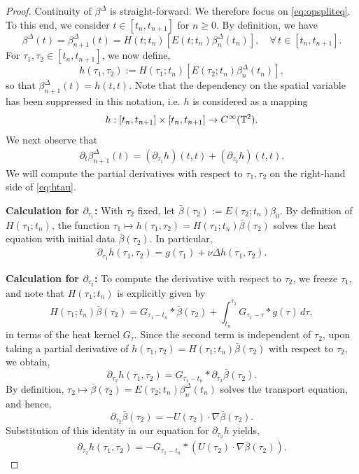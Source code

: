 \documentclass[reqno,12pt]{amsart}
\begin{document}
\begin{proof}
Continuity of ${\beta}^\Delta$ is straight-forward. We therefore focus on \eqref{eq:opspliteq}. To this end, we consider $t \in [t_n,t_{n+1}]$ for $n\ge 0$. By definition, we have
\[
\beta^\Delta(t) =
{\beta}^\Delta_{n+1}(t)
=
 H(t;t_n) \left[ E(t;t_n) {\beta}_n^\Delta(t_n) \right],
 \quad \forall \, t\in [t_n,t_{n+1}].
\]
For $\tau_1,\tau_2 \in [t_n,t_{n+1}]$, we now define,
\[
h(\tau_1,\tau_2) := H(\tau_1;t_n)\left[ E(\tau_2;t_n) {\beta}_n^\Delta(t_n) \right],
\]
so that ${\beta}^\Delta_{n+1}(t) = h(t,t)$. Note that the dependency on the spatial variable has been suppressed in this notation, i.e. $h$ is considered as a mapping
\[
h: [t_n,t_{n+1}] \times [t_n, t_{n+1}]
\to C^\infty(\mathbb{T}^2).
\]
We next observe that
\begin{align}
\label{eq:htau}
\partial_t \beta^\Delta_{n+1}(t)
=
(\partial_{\tau_1} h)(t,t) + (\partial_{\tau_2} h)(t,t).
\end{align}
We will compute the partial derivatives with respect to $\tau_1, \tau_2$ on the right-hand side of \eqref{eq:htau}.

\textbf{Calculation for $\partial_{\tau_1}$:} With $\tau_2$ fixed, let $\bar{\beta}(\tau_2) := E(\tau_2;t_n) \beta_0$. By definition of $H(\tau_1;t_n)$, the function $\tau_1 \mapsto h(\tau_1,\tau_2) = H(\tau_1;t_n) \bar{\beta}(\tau_2)$ solves the heat equation with initial data $\bar{\beta}(\tau_2)$. In particular,
\begin{align}
\label{eq:htau1}
\partial_{\tau_1} h(\tau_1,\tau_2) = g(\tau_1) + \nu \Delta h(\tau_1,\tau_2).
\end{align}

\textbf{Calculation for $\partial_{\tau_2}$:} To compute the derivative with respect to $\tau_2$, we freeze $\tau_1$, and note that $H(\tau_1;t_n)$ is explicitly given by
\[
H(\tau_1;t_n) \bar{\beta}(\tau_2)
= G_{\tau_1 - t_n} \ast \bar{\beta}(\tau_2)
+ \int_{t_n}^{\tau_1} G_{\tau_1 - \tau} \ast g(\tau) \, d\tau,
\]
in terms of the heat kernel $G_\tau$. Since the second term is independent of $\tau_2$, upon taking a partial derivative of $h(\tau_1,\tau_2) = H(\tau_1;t_n) \bar{\beta}(\tau_2)$ with respect to $\tau_2$, we obtain,
\[
\partial_{\tau_2} h(\tau_1, \tau_2)
=
G_{\tau_1-t_n} \ast \partial_{\tau_2} \bar{\beta}(\tau_2).
\]
By definition, $\tau_2 \mapsto \bar{\beta}(\tau_2) = E(\tau_2;t_n) \beta_n^\Delta(t_n)$ solves the transport equation, and hence,
\[
\partial_{\tau_2} \bar{\beta}(\tau_2)
=
- U(\tau_2) \cdot \nabla \bar{\beta}(\tau_2).
\]
Substitution of this identity in our equation for $\partial_{\tau_2}h$ yields,
\begin{align}
\label{eq:htau2}
\partial_{\tau_2} h(\tau_1, \tau_2)
=
- G_{\tau_1-t_n} \ast \left( U(\tau_2) \cdot \nabla \bar{\beta}(\tau_2) \right).
\end{align}


\end{proof}
\end{document}
